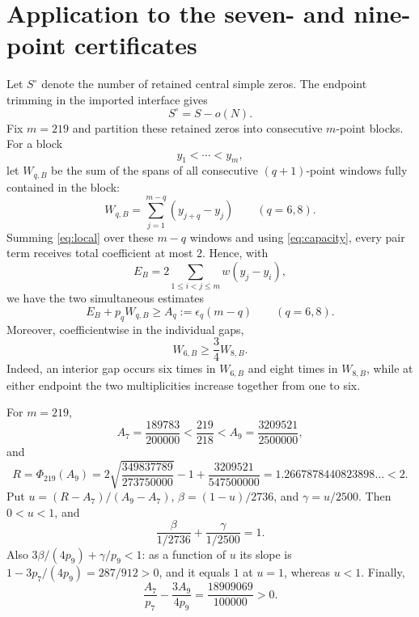 \documentclass[11pt]{amsart}
\theoremstyle{remark}
\begin{document}
\section{Application to the seven- and nine-point certificates}

Let $S^\circ$ denote the number of retained central simple zeros.  The
endpoint trimming in the imported interface gives
\begin{equation}\label{eq:retained}
 S^\circ=S-o(N).
\end{equation}
Fix $m=219$ and partition these retained zeros into consecutive $m$-point
blocks.  For a block
\[
 y_1<\cdots<y_m,
\]
let $W_{q,B}$ be the sum of the spans of all consecutive $(q+1)$-point
windows fully contained in the block:
\[
 W_{q,B}=\sum_{j=1}^{m-q}(y_{j+q}-y_j)\qquad(q=6,8).
\]
Summing \eqref{eq:local} over these $m-q$ windows and using
\eqref{eq:capacity}, every pair term receives total coefficient at most
$2$.  Hence, with
\[
 E_B=2\sum_{1\le i<j\le m}w(y_j-y_i),
\]
we have the two simultaneous estimates
\begin{equation}\label{eq:block-energy}
 E_B+p_qW_{q,B}\ge A_q:=\epsilon_q(m-q)
 \qquad(q=6,8).
\end{equation}
Moreover, coefficientwise in the individual gaps,
\begin{equation}\label{eq:span-comparison}
 W_{6,B}\ge\frac34W_{8,B}.
\end{equation}
Indeed, an interior gap occurs six times in $W_{6,B}$ and eight times in
$W_{8,B}$, while at either endpoint the two multiplicities increase together
from one to six.

For $m=219$,
\[
 A_7=\frac{189783}{200000}<\frac{219}{218}
 <A_9=\frac{3209521}{2500000},
\]
and
\begin{equation}\label{eq:R}
 R=\Phi_{219}(A_9)
 =2\sqrt{\frac{349837789}{273750000}}-1
   +\frac{3209521}{547500000}
 =1.2667878440823898\ldots<2.
\end{equation}
Put $u=(R-A_7)/(A_9-A_7)$,
$\beta=(1-u)/2736$, and $\gamma=u/2500$.
Then $0<u<1$, and
\[
 \frac{\beta}{1/2736}+\frac{\gamma}{1/2500}=1.
\]
Also $3\beta/(4p_9)+\gamma/p_9<1$: as a function of $u$ its slope is
$1-3p_7/(4p_9)=287/912>0$, and it equals $1$ at $u=1$, whereas $u<1$.
Finally,
\[
 \frac{A_7}{p_7}-\frac{3A_9}{4p_9}
 =\frac{18909069}{100000}>0.
\]
\end{document}
